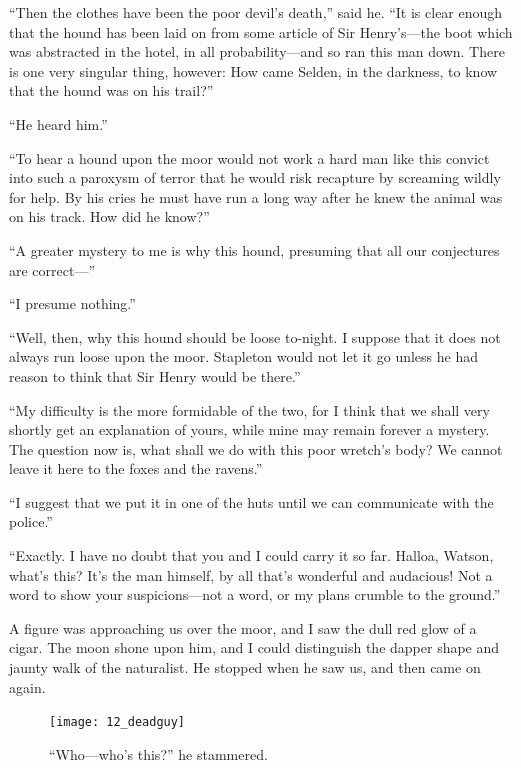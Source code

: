 \documentclass[paper=5.5in:8.5in,BCOR=7mm,twoside,DIV=calc,12pt,usegeometry,openany,chapterprefix,endperiod]{scrbook} %
\begin{document}
\enquote{Then the clothes have been the poor devil's death,} said he. \enquote{It is clear enough that the hound has been laid on from some article of Sir Henry's\nobreakdash---the boot which was abstracted in the hotel, in all probability\nobreakdash---and so ran this man down. There is one very singular thing, however: How came Selden, in the darkness, to know that the hound was on his trail?}

\enquote{He heard him.}

\enquote{To hear a hound upon the moor would not work a hard man like this convict into such a paroxysm of terror that he would risk recapture by screaming wildly for help. By his cries he must have run a long way after he knew the animal was on his track. How did he know?}

\enquote{A greater mystery to me is why this hound, presuming that all our conjectures are correct\nobreakdash---}

\enquote{I presume nothing.}

\enquote{Well, then, why this hound should be loose to-night. I suppose that it does not always run loose upon the moor. Stapleton would not let it go unless he had reason to think that Sir Henry would be there.}

\enquote{My difficulty is the more formidable of the two, for I think that we shall very shortly get an explanation of yours, while mine may remain forever a mystery. The question now is, what shall we do with this poor wretch's body? We cannot leave it here to the foxes and the ravens.}

\enquote{I suggest that we put it in one of the huts until we can communicate with the police.}

\enquote{Exactly. I have no doubt that you and I could carry it so far. Halloa, Watson, what's this? It's the man himself, by all that's wonderful and audacious! Not a word to show your suspicions\nobreakdash---not a word, or my plans crumble to the ground.}

A figure was approaching us over the moor, and I saw the dull red glow of a cigar. The moon shone upon him, and I could distinguish the dapper shape and jaunty walk of the naturalist. He stopped when he saw us, and then came on again.

\begin{figure}[tbph]
\centering
\texttt{[image: 12\_deadguy]}
\caption{\enquote{Who\nobreakdash---who's this?} he stammered.}
\end{figure}
\end{document}
